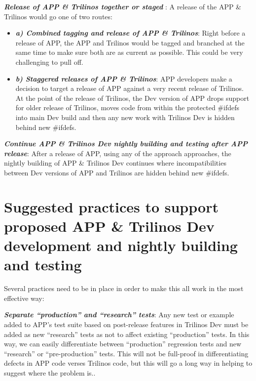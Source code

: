 \documentclass[pdf,ps2pdf,11pt]{SANDreport}
\begin{document}
{}\textit{\textbf{Release of APP \& Trilinos together or staged }}: A release
of the APP \& Trilinos would go one of two routes:

    \begin{itemize}

    {}\item\textit{\textbf{a) Combined tagging and release of APP \&
    Trilinos}}: Right before a release of APP, the APP and Trilinos would be
    tagged and branched at the same time to make sure both are as current as
    possible.  This could be very challenging to pull off.

    {}\item\textit{\textbf{b) Staggered releases of APP \& Trilinos}}: APP
    developers make a decision to target a release of APP against a very
    recent release of Trilinos.  At the point of the release of Trilinos, the
    Dev version of APP drops support for older release of Trilinos, moves code
    from within the protected {}\#ifdefs into main Dev build and then any new
    work with Trilinos Dev is hidden behind new {}\#ifdefs.

    \end{itemize}

{}\textit{\textbf{Continue APP \& Trilinos Dev nightly building and testing after
APP release}}: After a release of APP, using any of the approach approaches,
the nightly building of APP \& Trilinos Dev continues where incompatibilities
between Dev versions of APP and Trilinos are hidden behind new {}\#ifdefs.


%
{}\section{Suggested practices to support proposed APP \& Trilinos Dev
development and nightly building and testing}
%

Several practices need to be in place in order to make this all work in the
most effective way:

{}\textit{\textbf{Separate ``production'' and ``research'' tests}}: Any new
test or example added to APP's test suite based on post-release features in
Trilinos Dev must be added as new ``research'' tests as not to affect existing
``production'' tests.  In this way, we can easily differentiate between
``production'' regression tests and new ``research'' or ``pre-production'' tests.
This will not be full-proof in differentiating defects in APP code verses
Trilinos code, but this will go a long way in helping to suggest where the
problem is..
\end{document}

